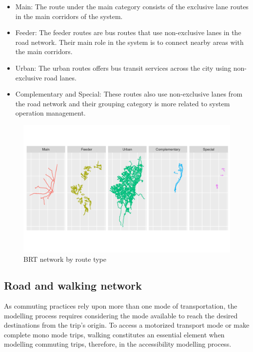 \documentclass[12pt, a4paper]{report}
\begin{document}
\begin{itemize}
  \item Main: The route under the main category consists of the exclusive lane routes in the main corridors of the system.
  \item Feeder: The feeder routes are bus routes that use non-exclusive lanes in the road network. Their main role in the system is to connect nearby areas with the main corridors.
  \item Urban: The urban routes offers bus transit services across the city using non-exclusive road lanes.
  \item Complementary and Special: These routes also use non-exclusive lanes from the road network and their grouping category is more related to system operation management.
\end{itemize}

\begin{figure}[H]
    \centering
    \includegraphics[width=15cm]{Data/Results/Images/BRT_Network_Route.png}
    \caption{BRT network by route type \citep{transmilenios.a.GTFSEstaticos202306212023}}
    \label{fig:BRT_route_type}
\end{figure}

\subsection{Road and walking network}

As commuting practices rely upon more than one mode of transportation, the modelling process requires considering the mode available to reach the desired destinations from the trip's origin. To access a motorized transport mode or make complete mono mode trips, walking constitutes an essential element when modelling commuting trips, therefore, in the accessibility modelling process.
\end{document}
